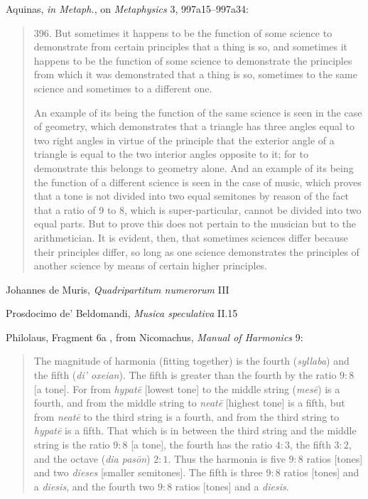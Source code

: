 \documentclass{article}
\theoremstyle{definition}
\begin{document}
Aquinas, {\em in Metaph.}, on {\em Metaphysics} 3, 997a15--997a34:

\begin{quote}
396. But sometimes it happens to be the function of some science to demonstrate from certain principles that a thing is so, and sometimes it happens to be the function of some science to demonstrate the principles from which it was demonstrated that a thing is so, sometimes to the same science and sometimes to a different one.

An example of its being the function of the same science is seen in the case of geometry, which demonstrates that a triangle has three angles equal to two right angles in virtue of the principle that the exterior angle of a triangle is equal to the two interior angles opposite to it; for to demonstrate this belongs to geometry alone. And an example of its being the function of a different science is seen in the case of music, which proves that a tone is not divided into two equal semitones by reason of the fact that a ratio of 9 to 8, which is super-particular, cannot be divided into two equal parts. But to prove this does not pertain to the musician but to the arithmetician. It is evident, then, that sometimes sciences differ because their principles differ, so long as one science demonstrates the principles of another science by means of certain higher principles.
\end{quote}

Johannes de Muris, {\em Quadripartitum numerorum} III \cite[p.~270]{huillier}

Prosdocimo de' Beldomandi, {\em Musica speculativa} II.15 \cite[pp.~198]{herlinger}


Philolaus, Fragment 6a  \cite[pp.~146--147]{philolaus},  from Nicomachus, {\em Manual of Harmonics} 9:

\begin{quote}
The magnitude of harmonia (fitting together) is the fourth ({\em syllaba}) and the fifth ({\em di' oxeian}). The fifth is greater than the fourth
by the ratio $9:8$ [a tone]. For from {\em hypat\={e}} [lowest tone] to the middle string ({\em mes\={e}}) is a fourth, and from the middle string to {\em neat\={e}} [highest tone] is a
fifth, but from {\em neat\={e}} to the third string is a fourth, and from the third string to {\em hypat\={e}} is a fifth. That which is in between the third string and the middle string is the
ratio $9:8$ [a tone], the fourth has the ratio $4:3$, the fifth $3:2$, and the octave ({\em dia pas\={o}n}) $2:1$. Thus the harmonia is five $9:8$ ratios [tones] and two {\em dieses}
 [smaller semitones]. The fifth is three $9:8$ ratios [tones] and a {\em diesis}, and the fourth two $9:8$ ratios [tones] and a {\em diesis}.
\end{quote}
\end{document}
